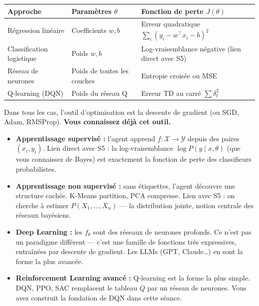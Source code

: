 \documentclass[11pt,a4paper]{article}
\begin{document}
\begin{center}
\renewcommand{\arraystretch}{1.4}
\begin{tabular}{lp{5cm}p{5cm}}
\toprule
\textbf{Approche} & \textbf{Paramètres $\theta$} & \textbf{Fonction de perte $J(\theta)$} \\
\midrule
Régression linéaire & Coefficients $w, b$ & Erreur quadratique $\sum_i (y_i - w^\top x_i - b)^2$ \\
Classification logistique & Poids $w, b$ & Log-vraisemblance négative (lien direct avec S5) \\
Réseau de neurones & Poids de toutes les couches & Entropie croisée ou MSE \\
Q-learning (DQN) & Poids du réseau Q & Erreur TD au carré $\sum \delta_t^2$ \\
\bottomrule
\end{tabular}
\end{center}

Dans tous les cas, l'outil d'optimisation est la descente de gradient (ou SGD, Adam, RMSProp). \textbf{Vous connaissez déjà cet outil.}

\begin{itemize}
    \item \textbf{Apprentissage supervisé :} l'agent apprend $f : \mathcal{X} \to \mathcal{Y}$ depuis des paires $(x_i, y_i)$. Lien direct avec S5 : la log-vraisemblance $\log P(y \mid x, \theta)$ (que vous connaissez de Bayes) est exactement la fonction de perte des classifieurs probabilistes.

    \item \textbf{Apprentissage non supervisé :} sans étiquettes, l'agent découvre une structure cachée. K-Means partition, PCA compresse. Lien avec S5 : on cherche à estimer $P(X_1, \ldots, X_n)$ --- la distribution jointe, notion centrale des réseaux bayésiens.

    \item \textbf{Deep Learning :} les $f_\theta$ sont des réseaux de neurones profonds. Ce n'est pas un paradigme différent --- c'est une famille de fonctions très expressives, entraînées par descente de gradient. Les LLMs (GPT, Claude\ldots) en sont la forme la plus avancée.

    \item \textbf{Reinforcement Learning avancé :} Q-learning est la forme la plus simple. DQN, PPO, SAC remplacent le tableau $Q$ par un réseau de neurones. Vous avez construit la fondation de DQN dans cette séance.
\end{itemize}
\end{document}
